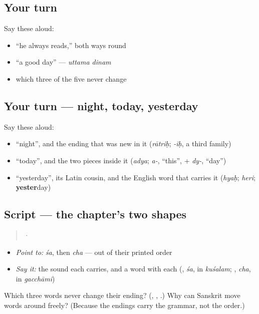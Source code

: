 \subsection*{Your turn}
Say these aloud:

\begin{itemize}
\raggedright
  \item \textquotedblleft{}he always reads,\textquotedblright{} both ways round
  \item \textquotedblleft{}a good day\textquotedblright{} — \emph{uttama dinam}
  \item which three of the five never change
\end{itemize}

\subsection*{Your turn — night, today, yesterday}
Say these aloud:

\begin{itemize}
\raggedright
  \item \textquotedblleft{}night\textquotedblright{}, and the ending that was new in it (\emph{rātriḥ}; \emph{-iḥ}, a third family)
  \item \textquotedblleft{}today\textquotedblright{}, and the two pieces inside it (\emph{adya}; \emph{a-}, \textquotedblleft{}this\textquotedblright{}, + \emph{dy-}, \textquotedblleft{}day\textquotedblright{})
  \item \textquotedblleft{}yesterday\textquotedblright{}, its Latin cousin, and the English word that carries it (\emph{hyaḥ}; \emph{heri}; \textbf{yester}day)
\end{itemize}

\subsection*{Script — the chapter's two shapes}
\begin{quote}
 · 
\end{quote}

\begin{itemize}
\raggedright
  \item \emph{Point to:} \emph{śa}, then \emph{cha} — out of their printed order
  \item \emph{Say it:} the sound each carries, and a word with each (\textbf{}, \emph{śa}, in \emph{kuśalam}; \textbf{}, \emph{cha}, in \emph{gacchāmi})
\end{itemize}

\begin{tcolorbox}[breakable,colback=teal!4,colframe=teal!35!black,title={Before you move on}]
Which three words never change their ending? (, , .) Why can Sanskrit move words around freely? (Because the endings carry the grammar, not the order.)
\end{tcolorbox}
